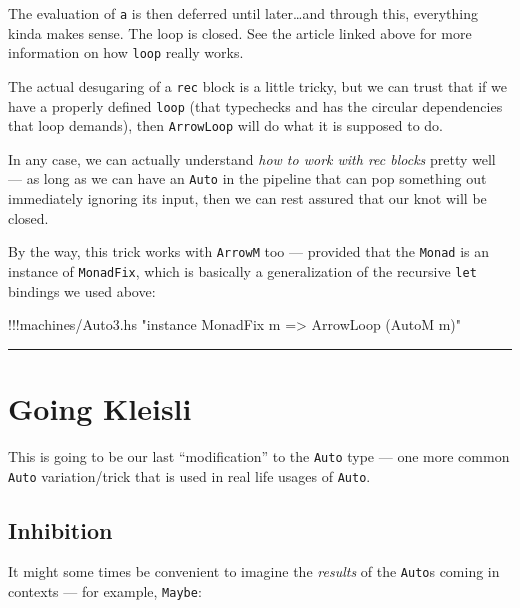 \documentclass[]{article}
\newenvironment{Shaded}{}{}
\newcommand{\StringTok}[1]{\textcolor[rgb]{0.25,0.44,0.63}{{#1}}}
\newcommand{\FunctionTok}[1]{\textcolor[rgb]{0.02,0.16,0.49}{{#1}}}
\newcommand{\NormalTok}[1]{{#1}}
\begin{document}
The evaluation of \texttt{a\textquotesingle{}} is then deferred until
later\ldots{}and through this, everything kinda makes sense. The loop is
closed. See the article linked above for more information on how
\texttt{loop} really works.

The actual desugaring of a \texttt{rec} block is a little tricky, but we
can trust that if we have a properly defined \texttt{loop} (that
typechecks and has the circular dependencies that loop demands), then
\texttt{ArrowLoop} will do what it is supposed to do.

In any case, we can actually understand \emph{how to work with rec
blocks} pretty well --- as long as we can have an \texttt{Auto} in the
pipeline that can pop something out immediately ignoring its input, then
we can rest assured that our knot will be closed.

By the way, this trick works with \texttt{ArrowM} too --- provided that
the \texttt{Monad} is an instance of \texttt{MonadFix}, which is
basically a generalization of the recursive \texttt{let} bindings we
used above:

\begin{Shaded}
\begin{Highlighting}[]
\FunctionTok{!!!}\NormalTok{machines}\FunctionTok{/}\NormalTok{Auto3.hs }\StringTok{"instance MonadFix m => ArrowLoop (AutoM m)"}
\end{Highlighting}
\end{Shaded}

\begin{center}\rule{0.5\linewidth}{\linethickness}\end{center}

\section{Going Kleisli}\label{going-kleisli}

This is going to be our last ``modification'' to the \texttt{Auto} type
--- one more common \texttt{Auto} variation/trick that is used in real
life usages of \texttt{Auto}.

\subsection{Inhibition}\label{inhibition}

It might some times be convenient to imagine the \emph{results} of the
\texttt{Auto}s coming in contexts --- for example, \texttt{Maybe}:
\end{document}
